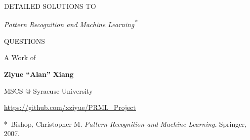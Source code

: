 \begin{titlepage}
	\vspace*{6cm}
	{\Huge \bfseries \scshape
	\begin{center}
		DETAILED SOLUTIONS TO
		
		{\itshape \huge Pattern Recognition and Machine Learning\textsuperscript{*}}
		
		QUESTIONS
	\end{center}
	}
	
	\vspace*{4cm}
	
	{\Large
	\begin{center}
		A Work of
		
		\vspace*{1em}
		{\bfseries Ziyue ``Alan'' Xiang}
		
		
		MSCS @ Syracuse University
		
		\vspace*{1.5cm}
		\url{https://github.com/xziyue/PRML_Project}
	\end{center}
	}

\vfill
{\footnotesize
	*~Bishop, Christopher M. \textit{Pattern Recognition and Machine Learning.} Springer, 2007.
}
	
\end{titlepage}
